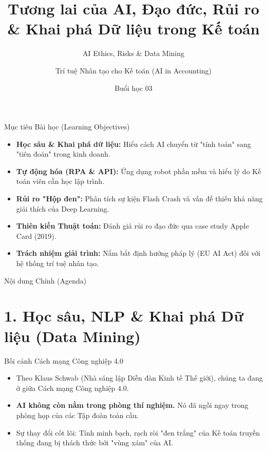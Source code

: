 \documentclass[aspectratio=169,12pt]{beamer}
\title[AI trong Kế toán - Buổi 3]{Tương lai của AI, Đạo đức, Rủi ro \\\& Khai phá Dữ liệu trong Kế toán}
\subtitle{AI Ethics, Risks \& Data Mining}
\author[Giảng viên]{Trí tuệ Nhân tạo cho Kế toán (AI in Accounting)}
\institute[Đại học]{Khoa Kế toán - Kiểm toán}
\date{Buổi học 03}
\begin{document}
\begin{frame}
    \titlepage
\end{frame}

\begin{frame}{Mục tiêu Bài học (Learning Objectives)}
    \begin{itemize}
        \item \textbf{Học sâu \& Khai phá dữ liệu:} Hiểu cách AI chuyển từ "tính toán" sang "tiên đoán" trong kinh doanh.
        \item \textbf{Tự động hóa (RPA \& API):} Ứng dụng robot phần mềm và hiểu lý do Kế toán viên cần học lập trình.
        \item \textbf{Rủi ro "Hộp đen":} Phân tích sự kiện Flash Crash và vấn đề thiếu khả năng giải thích của Deep Learning.
        \item \textbf{Thiên kiến Thuật toán:} Đánh giá rủi ro đạo đức qua case study Apple Card (2019).
        \item \textbf{Trách nhiệm giải trình:} Nắm bắt định hướng pháp lý (EU AI Act) đối với hệ thống trí tuệ nhân tạo.
    \end{itemize}
\end{frame}

\begin{frame}{Nội dung Chính (Agenda)}
    \tableofcontents
\end{frame}

\section{1. Học sâu, NLP \& Khai phá Dữ liệu (Data Mining)}
\begin{frame}
    \tableofcontents[currentsection]
\end{frame}

\begin{frame}{Bối cảnh Cách mạng Công nghiệp 4.0}
    \begin{itemize}
        \item Theo Klaus Schwab (Nhà sáng lập Diễn đàn Kinh tế Thế giới), chúng ta đang ở giữa Cách mạng Công nghiệp 4.0.
        \item \textbf{AI không còn nằm trong phòng thí nghiệm.} Nó đã ngồi ngay trong phòng họp của các Tập đoàn toàn cầu.
        \item Sự thay đổi cốt lõi: Tính minh bạch, rạch ròi "đen trắng" của Kế toán truyền thống đang bị thách thức bởi "vùng xám" của AI.
    \end{itemize}
\end{frame}
\end{document}
